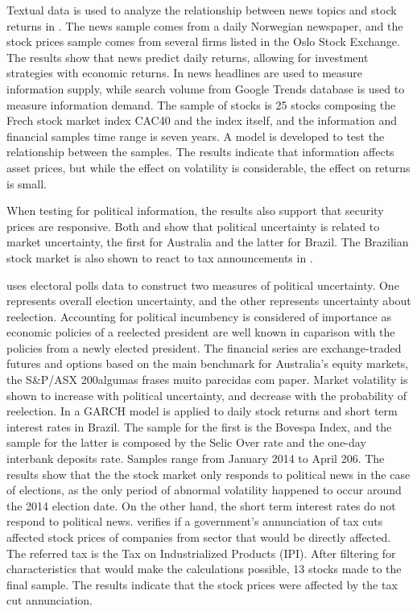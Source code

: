 \documentclass[cic,tc, english]{iiufrgs}
\begin{document}
    Textual data is used to analyze the relationship between news topics and stock returns in \citet{larsenthorsrud2017}. The news sample comes from a daily Norwegian newspaper, and the stock prices sample comes from several firms listed in the Oslo Stock Exchange. The results show that news predict daily returns, allowing for investment strategies with economic returns.
    In \citet{moussaetal2017} news headlines are used to measure information supply, while search volume from Google Trends database is used to measure information demand. The sample of stocks is 25 stocks composing the Frech stock market index CAC40 and the index itself, and the information and financial samples time range is seven years. A model is developed to test the relationship between the samples. The results indicate that information affects asset prices, but while the effect on volatility is considerable, the effect on returns is small.

    When testing for political information, the results also support that security prices are responsive. Both \citet{smales2015} and \citet{marquessantos2016} show that political uncertainty is related to market uncertainty, the first for Australia and the latter for Brazil. The Brazilian stock market is also shown to react to tax announcements in \cite{gabrielribeiro2013}.

    \citet{smales2015} uses electoral polls data to construct two measures of political uncertainty. One represents overall election uncertainty, and the other represents uncertainty about reelection. Accounting for political incumbency is considered of importance as economic policies of a reelected president are well known in caparison with the policies from a newly elected president. The financial series are exchange-traded futures and options based on the main benchmark for Australia's equity markets, the S\&P/ASX 200{algumas frases muito parecidas com paper}. Market volatility is shown to increase with political uncertainty, and decrease with the probability of reelection.
    In \citet{marquessantos2016} a GARCH model is applied to daily stock returns and short term interest rates in Brazil. The sample for the first is the Bovespa Index, and the sample for the latter is composed by the Selic Over rate and the one-day interbank deposits rate. Samples range from January 2014 to April 206. The results show that the the stock market only responds to political news in the case of elections, as the only period of abnormal volatility happened to occur around the 2014 election date. On the other hand, the short term interest rates do not respond to political news.
    \cite{gabrielribeiro2013} verifies if a government's annunciation of tax cuts affected stock prices of companies from sector that would be directly affected. The referred tax is the Tax on Industrialized Products (IPI). After filtering for characteristics that would make the calculations possible, 13 stocks made to the final sample. The results indicate that the stock prices were affected by the tax cut annunciation.
\end{document}

